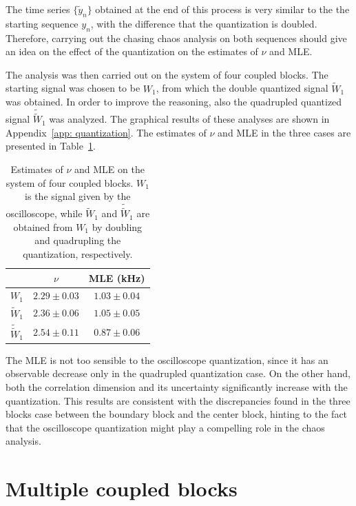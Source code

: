 The time series $\{\tilde{y}_n\}$ obtained at the end of this process is very similar to the
the starting sequence $y_n$, with the difference that the quantization is doubled.
Therefore, carrying out the chasing chaos analysis on both sequences should give an idea on the
effect of the quantization on the estimates of $\nu$ and MLE\@.

The analysis was then carried out on the system of four coupled blocks.
The starting signal was chosen to be $W_1$, from which the double quantized signal $\tilde{W}_1$
was obtained. In order to improve the reasoning, also the quadrupled quantized signal $\tilde{\tilde{W}}_1$
was analyzed. The graphical results of these analyses are shown in Appendix~\ref{app: quantization}.
The estimates of $\nu$ and MLE in the three cases are presented in Table~\ref{tab: quantization}.

\begin{table}[ht!]
    \centering
    \begin{tabular}{c|c|c}
                    & $\nu$         & MLE (kHz)     \\ \hline
        $W_1$       & $2.29\pm0.03$   & $1.03\pm0.04$ \\ \hline
        $\tilde{W}_1$ & $2.36\pm0.06$   & $1.05\pm0.05$ \\ \hline
        $\tilde{\tilde{W}}_1$ & $2.54\pm0.11$ & $0.87\pm0.06$
    \end{tabular}
    \caption{Estimates of $\nu$ and MLE on the system of four coupled blocks.
    $W_1$ is the signal given by the oscilloscope, while $\tilde{W}_1$ and $\tilde{\tilde{W}}_1$ are
    obtained from $W_1$ by doubling and quadrupling the quantization, respectively.
    }\label{tab: quantization}
\end{table}

The MLE is not too sensible to the oscilloscope quantization, since it has an observable decrease
only in the quadrupled quantization case. On the other hand, both the correlation dimension and
its uncertainty significantly increase with the quantization.
This results are consistent with the discrepancies found in the three blocks case between
the boundary block and the center block, hinting to the fact that the oscilloscope quantization
might play a compelling role in the chaos analysis.


\section{Multiple coupled blocks}\label{sec: many blocks chaos}

